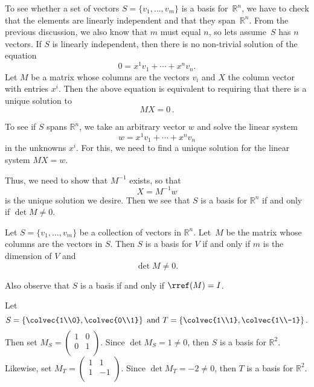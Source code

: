 To see whether a set of vectors $S=\{v_1, \ldots, v_m \}$ is a basis for~$\mathbb{R}^n$, we have to check that the elements  are linearly independent and that they span~$\mathbb{R}^n$.  From the previous discussion, we also know that $m$ must equal $n$, so lets assume~$S$ has $n$ vectors.
If $S$ is linearly independent, then there is no non-trivial solution of the equation
\[
0 = x^1v_1+\cdots + x^nv_n.
\]
Let $M$ be a matrix whose columns are the vectors $v_i$ and $X$ the column vector with entries $x^i$.  Then the above equation is equivalent to requiring that there is a unique solution to \[MX=0\, .\]

To see if $S$ spans $\mathbb{R}^n$, we take an arbitrary vector $w$ and solve the linear system
\[
w=x^1v_1+\cdots + x^nv_n
\]
in the unknowns $x^i$.  For this, we need to find a unique solution for the linear system $MX=w$.  

Thus, we need to show that $M^{-1}$ exists, so that 
\[
X=M^{-1}w
\]
is the unique solution we desire.  Then we see that $S$ is a basis for $\mathbb{R}^n$ if and only if $\det M\neq 0$.




\begin{theorem}
Let $S=\{v_1, \ldots, v_m \}$ be a collection of vectors in $\mathbb{R}^n$.  Let~$M$ be the matrix whose columns are the vectors in $S$.  Then $S$ is a basis for $V$ if and only if $m$ is the dimension of $V$ and 
\[
\det M \neq 0.
\]
\end{theorem}

\begin{remark}
Also observe that  $S$ is a basis if and only if $\rref(M)=I$.
\end{remark}

\begin{example}
Let 
\[
S=\left\{ \colvec{1\\0}, \colvec{0\\1} \right\} \text{ and }
T=\left\{ \colvec{1\\1}, \colvec{1\\-1} \right\}.
\]
Then set $M_S=\begin{pmatrix}
1 & 0\\
0 & 1\\
\end{pmatrix}$.  Since $\det M_S=1\neq 0$, then $S$ is a basis for $\mathbb{R}^2$.\\

\noindent
Likewise, set $M_T=\begin{pmatrix}
1 & 1\\
1 & -1\\
\end{pmatrix}$.  Since $\det M_T=-2\neq 0$, then $T$ is a basis for $\mathbb{R}^2$.
\end{example}



